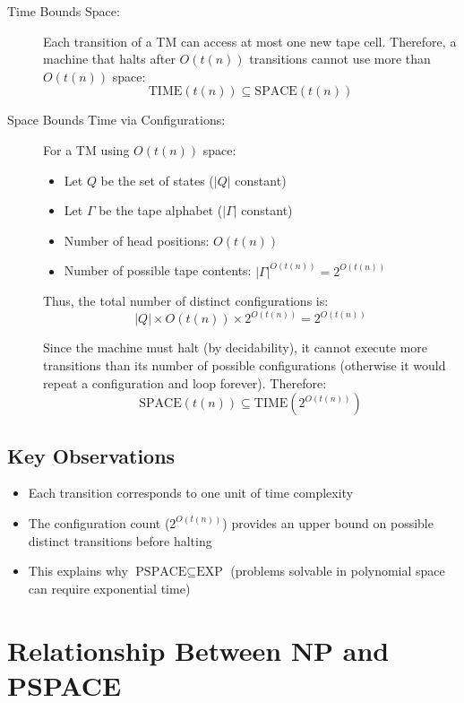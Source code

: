 \begin{description}
    \item[Time Bounds Space:] 
    Each transition of a TM can access at most one new tape cell. Therefore, a machine that halts after $O(t(n))$ transitions cannot use more than $O(t(n))$ space:
    \[
    \text{TIME}(t(n)) \subseteq \text{SPACE}(t(n))
    \]
    
    \item[Space Bounds Time via Configurations:]
    For a TM using $O(t(n))$ space:
    \begin{itemize}
        \item Let $Q$ be the set of states ($|Q|$ constant)
        \item Let $\Gamma$ be the tape alphabet ($|\Gamma|$ constant)
        \item Number of head positions: $O(t(n))$
        \item Number of possible tape contents: $|\Gamma|^{O(t(n))} = 2^{O(t(n))}$
    \end{itemize}
    Thus, the total number of distinct configurations is:
    \[
    |Q| \times O(t(n)) \times 2^{O(t(n))} = 2^{O(t(n))}
    \]
    
    Since the machine must halt (by decidability), it cannot execute more transitions than its number of possible configurations (otherwise it would repeat a configuration and loop forever). Therefore:
    \[
    \text{SPACE}(t(n)) \subseteq \text{TIME}(2^{O(t(n))})
    \]
\end{description}

\subsection{Key Observations}
\begin{itemize}
    \item Each transition corresponds to one unit of time complexity
    \item The configuration count ($2^{O(t(n))}$) provides an upper bound on possible distinct transitions before halting
    \item This explains why $\text{PSPACE} \subseteq \text{EXP}$ (problems solvable in polynomial space can require exponential time)
\end{itemize}

\section{Relationship Between NP and PSPACE}

